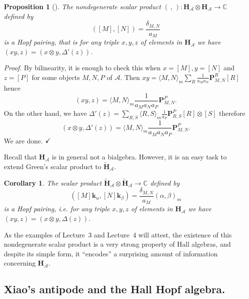 \documentclass[a4paper,10pt]{amsart}
\def\H{\mathbf{H}}
\def\qed{$\hfill \checkmark$}
\def\a{\alpha}
\def\C{\mathbb{C}}
\def\A{\mathcal{A}}
\newtheorem{cor}[theo]{Corollary}
\newtheorem{prop}[theo]{Proposition}
\numberwithin{equation}{section}
\begin{document}
\begin{prop}[\cite{Green}] The nondegenerate scalar product $(\,,\,): {\H}_{\A} \otimes {\H}_{\A} \to \C$ defined by
\begin{equation}\label{E:Greenscalar}
([M],[N])=\frac{\delta_{M,N}}{a_M}
\end{equation}
is a Hopf pairing, that is for any triple $x,y,z$ of elements in $\H_{\A}$ we have $(xy,z)=(x \otimes y, \Delta'(z))$.
\end{prop}
\noindent
\textit{Proof.} By bilinearity, it is enough to check this when $x=[M], y=[N]$ and $z=[P]$ for some objects $M,N,P$ of $\mathcal{A}$. Then $xy=\langle M,N\rangle_m \sum_R \frac{1}{a_Ma_N} \mathbf{P}^R_{M,N}[R]$ hence
$$(xy,z)=\langle M,N \rangle_m \frac{1}{a_Ma_Na_P}\mathbf{P}^P_{M,N}.$$
On the other hand, we have $\Delta'(z)=\sum_{R,S} \langle R,S \rangle_m \frac{1}{a_P} \mathbf{P}^P_{R,S} [R] \otimes [S]$ therefore
$$(x \otimes y,\Delta'(z))=\langle M,N \rangle_m \frac{1}{a_Ma_Na_P}\mathbf{P}^P_{M,N}.$$
We are done. \qed

\vspace{.15in}

Recall that $\mathbf{H}_{\mathcal{A}}$ is in general not a bialgebra. However, it is an easy task to extend Green's scalar product to $\widetilde{\mathbf{H}}_{\mathcal{A}}$.

\begin{cor} The scalar product $\widetilde{\mathbf{H}}_{\mathcal{A}} \otimes \widetilde{\mathbf{H}}_{\mathcal{A}} \to \mathbb{C}$ defined by
\begin{equation}\label{E:Greenscalar2}
([M]\mathbf{k}_{\a},[N]\mathbf{k}_{\beta})=\frac{\delta_{M,N}}{a_M}(\a,\beta)_m
\end{equation}
is a Hopf pairing, i.e. for any triple $x,y,z$ of elements in $\H_{\A}$ we have $(xy,z)=(x \otimes y, \Delta(z))$.
\end{cor}

\vspace{.12in}

As the examples of Lecture~3 and Lecture~4 will attest, the existence of this nondegenerate scalar product is a very strong property of Hall algebras, and despite its simple form, it ``encodes''  a surprising amount of information concerning $\H_{\A}$.

\newpage

\subsection{Xiao's antipode and the Hall Hopf algebra.}
\end{document}
